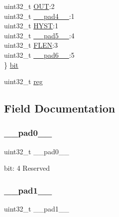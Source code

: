 \begin{DoxyCompactItemize}
\begin{tabbing}
\>uint32\_t \mbox{\hyperlink{union_a_c___c_o_m_p_c_t_r_l___type_a851d3bfd5c730069acca56cf03a3c559}{OUT}}:2\\
\>uint32\_t \mbox{\hyperlink{union_a_c___c_o_m_p_c_t_r_l___type_a7b2edc85d90e34c4435951e1e5c59517}{\_\_pad4\_\_}}:1\\
\>uint32\_t \mbox{\hyperlink{union_a_c___c_o_m_p_c_t_r_l___type_a2da063af1b85e87cd6a50876ed4204ff}{HYST}}:1\\
\>uint32\_t \mbox{\hyperlink{union_a_c___c_o_m_p_c_t_r_l___type_ab025634e229ec6df5ae63fd78be1f27b}{\_\_pad5\_\_}}:4\\
\>uint32\_t \mbox{\hyperlink{union_a_c___c_o_m_p_c_t_r_l___type_a7b27d0487eee81c09cc0166170772ffc}{FLEN}}:3\\
\>uint32\_t \mbox{\hyperlink{union_a_c___c_o_m_p_c_t_r_l___type_a9bf3ba9849347338e4a72e6c4e3758f7}{\_\_pad6\_\_}}:5\\
\} \mbox{\hyperlink{union_a_c___c_o_m_p_c_t_r_l___type_ab54149dd2bfbe644c0517cac47244d4f}{bit}}\\

\end{tabbing}\item 
uint32\+\_\+t \mbox{\hyperlink{union_a_c___c_o_m_p_c_t_r_l___type_a6b91636401516a477989a336376d7b40}{reg}}
\end{DoxyCompactItemize}


\subsection{Field Documentation}
\mbox{\label{union_a_c___c_o_m_p_c_t_r_l___type_a3e57c2ef1c3ffb36722f000cc1156824}} 
\subsubsection{\texorpdfstring{\_\_pad0\_\_}{\_\_pad0\_\_}}
{\footnotesize\ttfamily uint32\+\_\+t \+\_\+\+\_\+pad0\+\_\+\+\_\+}

bit\+: 4 Reserved \mbox{\label{union_a_c___c_o_m_p_c_t_r_l___type_a6712ba6dd1d5b43d2d56ff8ac4e275a7}} 
\subsubsection{\texorpdfstring{\_\_pad1\_\_}{\_\_pad1\_\_}}
{\footnotesize\ttfamily uint32\+\_\+t \+\_\+\+\_\+pad1\+\_\+\+\_\+}

